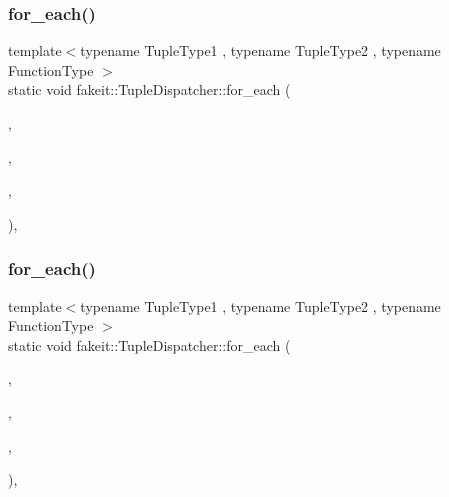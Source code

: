 \mbox{\label{structfakeit_1_1TupleDispatcher_a30fb1a59df83f4faaa461d3fee4b20bc}} 
\subsubsection{\texorpdfstring{for\_each()}{for\_each()}\hspace{0.1cm}{\footnotesize\ttfamily [36/54]}}
{\footnotesize\ttfamily template$<$typename Tuple\+Type1 , typename Tuple\+Type2 , typename Function\+Type $>$ \\
static void fakeit\+::\+Tuple\+Dispatcher\+::for\+\_\+each (\begin{DoxyParamCaption}\item[{Tuple\+Type1 \&\&}]{,  }\item[{Tuple\+Type2 \&\&}]{,  }\item[{Function\+Type \&}]{,  }\item[{std\+::integral\+\_\+constant$<$ size\+\_\+t, std\+::tuple\+\_\+size$<$ typename std\+::remove\+\_\+reference$<$ Tuple\+Type1 $>$\+::type $>$\+::value $>$}]{ }\end{DoxyParamCaption})\hspace{0.3cm}{\ttfamily [inline]}, {\ttfamily [static]}}

\mbox{\label{structfakeit_1_1TupleDispatcher_a30fb1a59df83f4faaa461d3fee4b20bc}} 
\subsubsection{\texorpdfstring{for\_each()}{for\_each()}\hspace{0.1cm}{\footnotesize\ttfamily [37/54]}}
{\footnotesize\ttfamily template$<$typename Tuple\+Type1 , typename Tuple\+Type2 , typename Function\+Type $>$ \\
static void fakeit\+::\+Tuple\+Dispatcher\+::for\+\_\+each (\begin{DoxyParamCaption}\item[{Tuple\+Type1 \&\&}]{,  }\item[{Tuple\+Type2 \&\&}]{,  }\item[{Function\+Type \&}]{,  }\item[{std\+::integral\+\_\+constant$<$ size\+\_\+t, std\+::tuple\+\_\+size$<$ typename std\+::remove\+\_\+reference$<$ Tuple\+Type1 $>$\+::type $>$\+::value $>$}]{ }\end{DoxyParamCaption})\hspace{0.3cm}{\ttfamily [inline]}, {\ttfamily [static]}}

